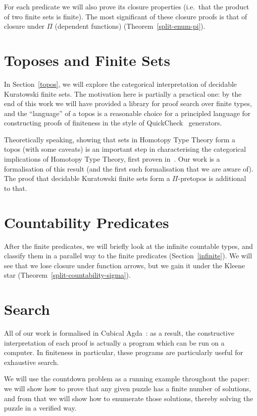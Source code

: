 For each predicate we will also prove its closure properties (i.e.\ that the
product of two finite sets is finite).
The most significant of these closure proofs is that of closure under \(\Pi\)
(dependent functions) (Theorem~\ref{split-enum-pi}).
\section{Toposes and Finite Sets}
In Section~\ref{topos}, we will explore the categorical interpretation of
decidable Kuratowski finite sets.
The motivation here is partially a practical one: by the end of this work we
will have provided a library for proof search over finite types, and the
``language'' of a topos is a reasonable choice for a principled language for
constructing proofs of finiteness in the style of
QuickCheck~\cite{claessenQuickCheckLightweightTool2011} generators.

Theoretically speaking, showing that sets in Homotopy Type Theory form a topos
(with some caveats) is an important step in characterising the categorical
implications of Homotopy Type Theory, first proven
in~\cite{rijkeSetsHomotopyType2015}.
Our work is a formalisation of this result (and the first such formalisation
that we are aware of).
The proof that decidable Kuratowski finite sets form a \(\Pi\)-pretopos is
additional to that.
\section{Countability Predicates}
After the finite predicates, we will briefly look at the infinite countable
types, and classify them in a parallel way to the finite predicates
(Section~\ref{infinite}).
We will see that we lose closure under function arrows, but we gain it under the
Kleene star (Theorem~\ref{split-countability-sigma}).
\section{Search}
All of our work is formalised in Cubical
Agda~\cite{vezzosiCubicalAgdaDependently2019}: as a result, the constructive
interpretation of each proof is actually a program which can be run on a
computer.
In finiteness in particular, these programs are particularly useful for
exhaustive search.

We will use the countdown problem as a running example throughout the paper: we
will show how to prove that any given puzzle has a finite number of solutions,
and from that we will show how to enumerate those solutions, thereby solving the
puzzle in a verified way.

